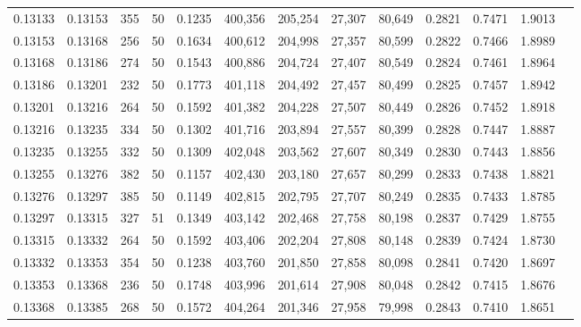 \begin{tabular}{rrrrrrrrrrrrr}
0.13133 & 0.13153 &   355 &  50 &                                     0.1235 & 400,356 & 205,254 &  27,307 &  80,649 & 0.2821 & 0.7471 & 1.9013 \\
0.13153 & 0.13168 &   256 &  50 &                                     0.1634 & 400,612 & 204,998 &  27,357 &  80,599 & 0.2822 & 0.7466 & 1.8989 \\
0.13168 & 0.13186 &   274 &  50 &                                     0.1543 & 400,886 & 204,724 &  27,407 &  80,549 & 0.2824 & 0.7461 & 1.8964 \\
0.13186 & 0.13201 &   232 &  50 &                                     0.1773 & 401,118 & 204,492 &  27,457 &  80,499 & 0.2825 & 0.7457 & 1.8942 \\
0.13201 & 0.13216 &   264 &  50 &                                     0.1592 & 401,382 & 204,228 &  27,507 &  80,449 & 0.2826 & 0.7452 & 1.8918 \\
0.13216 & 0.13235 &   334 &  50 &                                     0.1302 & 401,716 & 203,894 &  27,557 &  80,399 & 0.2828 & 0.7447 & 1.8887 \\
0.13235 & 0.13255 &   332 &  50 &                                     0.1309 & 402,048 & 203,562 &  27,607 &  80,349 & 0.2830 & 0.7443 & 1.8856 \\
0.13255 & 0.13276 &   382 &  50 &                                     0.1157 & 402,430 & 203,180 &  27,657 &  80,299 & 0.2833 & 0.7438 & 1.8821 \\
0.13276 & 0.13297 &   385 &  50 &                                     0.1149 & 402,815 & 202,795 &  27,707 &  80,249 & 0.2835 & 0.7433 & 1.8785 \\
0.13297 & 0.13315 &   327 &  51 &                                     0.1349 & 403,142 & 202,468 &  27,758 &  80,198 & 0.2837 & 0.7429 & 1.8755 \\
0.13315 & 0.13332 &   264 &  50 &                                     0.1592 & 403,406 & 202,204 &  27,808 &  80,148 & 0.2839 & 0.7424 & 1.8730 \\
0.13332 & 0.13353 &   354 &  50 &                                     0.1238 & 403,760 & 201,850 &  27,858 &  80,098 & 0.2841 & 0.7420 & 1.8697 \\
0.13353 & 0.13368 &   236 &  50 &                                     0.1748 & 403,996 & 201,614 &  27,908 &  80,048 & 0.2842 & 0.7415 & 1.8676 \\
0.13368 & 0.13385 &   268 &  50 &                                     0.1572 & 404,264 & 201,346 &  27,958 &  79,998 & 0.2843 & 0.7410 & 1.8651 \\

\end{tabular}
